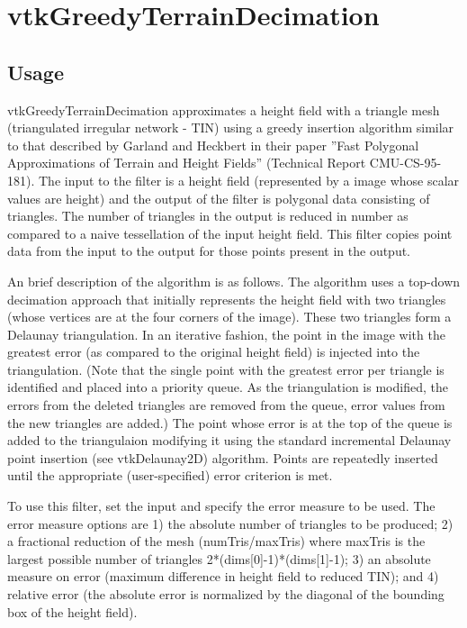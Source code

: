 \section{vtkGreedyTerrainDecimation}

\subsection{Usage}

 vtkGreedyTerrainDecimation approximates a height field with a triangle
 mesh (triangulated irregular network - TIN) using a greedy insertion
 algorithm similar to that described by Garland and Heckbert in their paper
 ''Fast Polygonal Approximations of Terrain and Height Fields'' (Technical
 Report CMU-CS-95-181).  The input to the filter is a height field
 (represented by a image whose scalar values are height) and the output of
 the filter is polygonal data consisting of triangles. The number of
 triangles in the output is reduced in number as compared to a naive
 tessellation of the input height field. This filter copies point data
 from the input to the output for those points present in the output.

 An brief description of the algorithm is as follows. The algorithm uses a
 top-down decimation approach that initially represents the height field
 with two triangles (whose vertices are at the four corners of the
 image). These two triangles form a Delaunay triangulation. In an iterative
 fashion, the point in the image with the greatest error (as compared to
 the original height field) is injected into the triangulation. (Note that
 the single point with the greatest error per triangle is identified and
 placed into a priority queue. As the triangulation is modified, the errors
 from the deleted triangles are removed from the queue, error values from
 the new triangles are added.) The point whose error is at the top of the
 queue is added to the triangulaion modifying it using the standard
 incremental Delaunay point insertion (see vtkDelaunay2D) algorithm. Points
 are repeatedly inserted until the appropriate (user-specified) error
 criterion is met.

 To use this filter, set the input and specify the error measure to be
 used.  The error measure options are 1) the absolute number of triangles
 to be produced; 2) a fractional reduction of the mesh (numTris/maxTris)
 where maxTris is the largest possible number of triangles
 2*(dims[0]-1)*(dims[1]-1); 3) an absolute measure on error (maximum
 difference in height field to reduced TIN); and 4) relative error (the
 absolute error is normalized by the diagonal of the bounding box of the
 height field).
 

